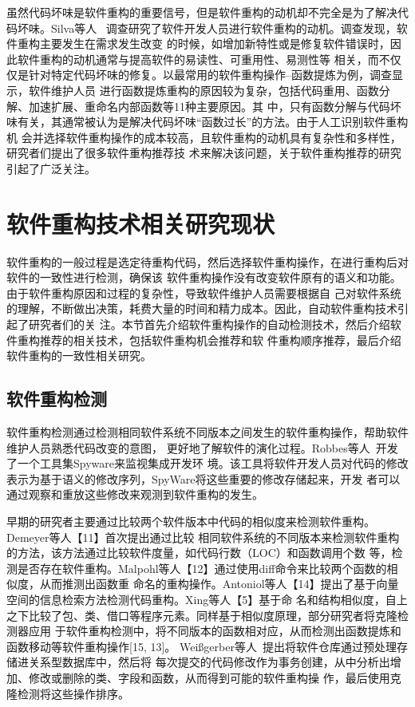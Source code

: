 虽然代码坏味是软件重构的重要信号，但是软件重构的动机却不完全是为了解决代码坏味。Silva等人
~\cite{Silva2016}调查研究了软件开发人员进行软件重构的动机。调查发现，软件重构主要发生在需求发生改变
的时候，如增加新特性或是修复软件错误时，因此软件重构的动机通常与提高软件的易读性、可重用性、易测性等
相关，而不仅仅是针对特定代码坏味的修复。以最常用的软件重构操作--函数提炼为例，调查显示，软件维护人员
进行函数提炼重构的原因较为复杂，包括代码重用、函数分解、加速扩展、重命名内部函数等11种主要原因。其
中，只有函数分解与代码坏味有关，其通常被认为是解决代码坏味``函数过长''的方法。由于人工识别软件重构机
会并选择软件重构操作的成本较高，且软件重构的动机具有复杂性和多样性，研究者们提出了很多软件重构推荐技
术来解决该问题，关于软件重构推荐的研究引起了广泛关注。

\section{软件重构技术相关研究现状}
软件重构的一般过程是选定待重构代码，然后选择软件重构操作，在进行重构后对软件的一致性进行检测，确保该
软件重构操作没有改变软件原有的语义和功能。由于软件重构原因和过程的复杂性，导致软件维护人员需要根据自
己对软件系统的理解，不断做出决策，耗费大量的时间和精力成本。因此，自动软件重构技术引起了研究者们的关
注。本节首先介绍软件重构操作的自动检测技术，然后介绍软件重构推荐的相关技术，包括软件重构机会推荐和软
件重构顺序推荐，最后介绍软件重构的一致性相关研究。

\subsection{软件重构检测}

软件重构检测通过检测相同软件系统不同版本之间发生的软件重构操作，帮助软件维护人员熟悉代码改变的意图，
更好地了解软件的演化过程。Robbes等人~\cite{robbes2008spyware}开发了一个工具集Spyware来监视集成开发环
境。该工具将软件开发人员对代码的修改表示为基于语义的修改序列，SpyWare将这些重要的修改存储起来，开发
者可以通过观察和重放这些修改来观测到软件重构的发生。

早期的研究者主要通过比较两个软件版本中代码的相似度来检测软件重构。Demeyer等人【11】首次提出通过比较
相同软件系统的不同版本来检测软件重构的方法，该方法通过比较软件度量，如代码行数（LOC）和函数调用个数
等，检测是否存在软件重构。Malpohl等人【12】通过使用diff命令来比较两个函数的相似度，从而推测出函数重
命名的重构操作。Antoniol等人【14】提出了基于向量空间的信息检索方法检测代码重构。Xing等人【5】基于命
名和结构相似度，自上之下比较了包、类、借口等程序元素。同样基于相似度原理，部分研究者将克隆检测器应用
于软件重构检测中，将不同版本的函数相对应，从而检测出函数提炼和函数移动等软件重构操作[15, 13]。
Weißgerber等人~\cite{weissgerber2006identifying}提出将软件仓库通过预处理存储进关系型数据库中，然后将
每次提交的代码修改作为事务创建，从中分析出增加、修改或删除的类、字段和函数，从而得到可能的软件重构操
作，最后使用克隆检测将这些操作排序。

